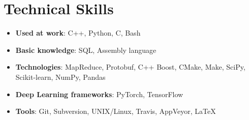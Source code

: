 \documentclass[letterpaper,11pt]{article}
\newcommand{\resumeItem}[2]{
  \item\small{
    \textbf{#1}{: #2 \vspace{-2pt}}
  }
}
\newcommand{\resumeSubItem}[2]{\resumeItem{#1}{#2}\vspace{-4pt}}
\newcommand{\resumeSubHeadingListStart}{\begin{itemize}[leftmargin=*]}
\newcommand{\resumeSubHeadingListEnd}{\end{itemize}}
\begin{document}
\vspace{-19pt}
\section{Technical Skills}
  \resumeSubHeadingListStart
    \resumeSubItem{Used at work}{C++, Python, C, Bash}
    \resumeSubItem{Basic knowledge}{SQL, Assembly language}
    \resumeSubItem{Technologies}{MapReduce, Protobuf, C++ Boost, CMake, Make, SciPy, Scikit-learn, NumPy, Pandas}
    \resumeSubItem{Deep Learning frameworks}{PyTorch, TensorFlow}
    \resumeSubItem{Tools}{Git, Subversion, UNIX/Linux, Travis, AppVeyor, \LaTeX}
  \resumeSubHeadingListEnd


\end{document}
